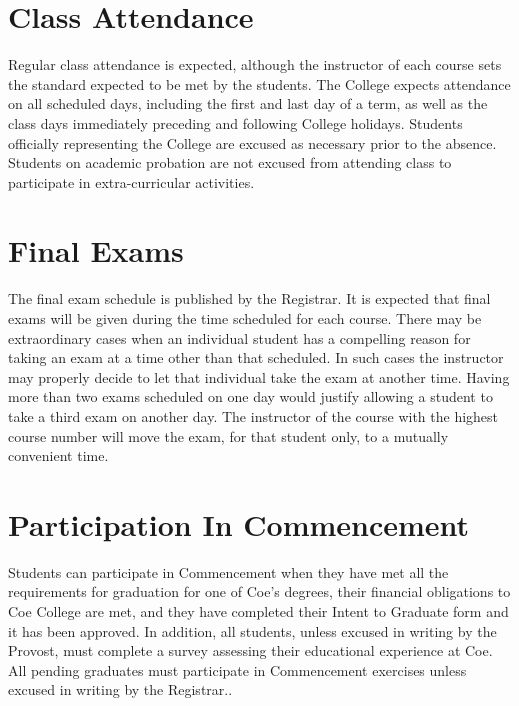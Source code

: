 \documentclass[
  letterpaper,
]{scrbook}
\begin{document}
\hypertarget{class-attendance}{%
\section{Class Attendance}\label{class-attendance}}

Regular class attendance is expected, although the instructor of each
course sets the standard expected to be met by the students. The College
expects attendance on all scheduled days, including the first and last
day of a term, as well as the class days immediately preceding and
following College holidays. Students officially representing the College
are excused as necessary prior to the absence. Students on academic
probation are not excused from attending class to participate in
extra-curricular activities.

\hypertarget{final-exams}{%
\section{Final Exams}\label{final-exams}}

The final exam schedule is published by the Registrar. It is expected
that final exams will be given during the time scheduled for each
course. There may be extraordinary cases when an individual student has
a compelling reason for taking an exam at a time other than that
scheduled. In such cases the instructor may properly decide to let that
individual take the exam at another time. Having more than two exams
scheduled on one day would justify allowing a student to take a third
exam on another day. The instructor of the course with the highest
course number will move the exam, for that student only, to a mutually
convenient time.

\hypertarget{participation-in-commencement}{%
\section{Participation In
Commencement}\label{participation-in-commencement}}

Students can participate in Commencement when they have met all the
requirements for graduation for one of Coe's degrees, their financial
obligations to Coe College are met, and they have completed their Intent
to Graduate form and it has been approved. In addition, all students,
unless excused in writing by the Provost, must complete a survey
assessing their educational experience at Coe. All pending graduates
must participate in Commencement exercises unless excused in writing by
the Registrar..
\end{document}
